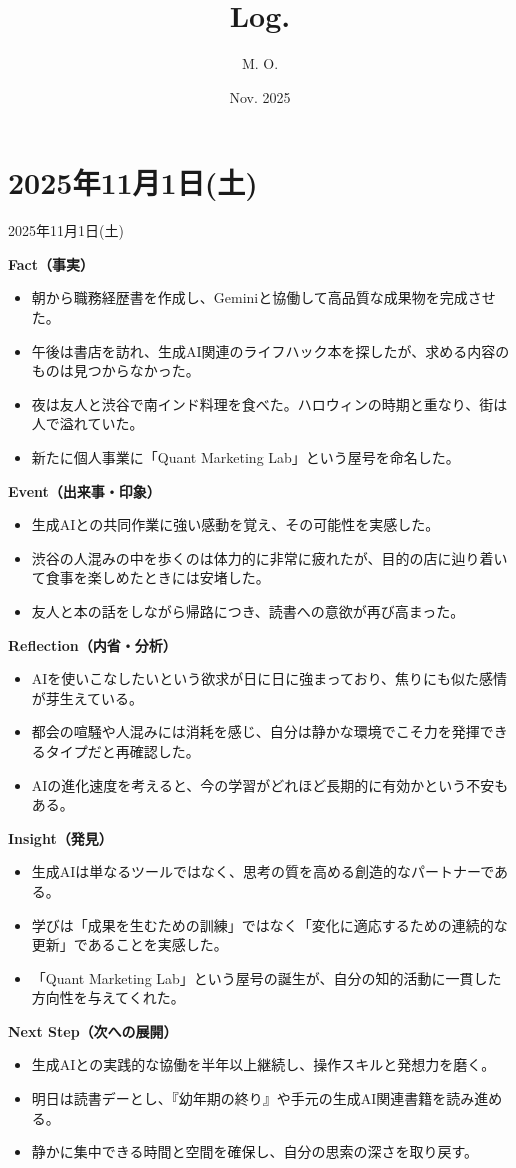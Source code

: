 \documentclass[dvipdfmx, autodetect-engine, aspectratio=169, 10.5pt]{beamer}
\title{
Log.
}
\author{
M. O.
}
\date{Nov. 2025}
\begin{document}
\maketitle

\section{2025年11月1日(土)} 
\begin{frame}{2025年11月1日(土)}  
	\tiny  

	\textbf{Fact（事実）}  
	\begin{itemize}
		\item 朝から職務経歴書を作成し、Geminiと協働して高品質な成果物を完成させた。  
		\item 午後は書店を訪れ、生成AI関連のライフハック本を探したが、求める内容のものは見つからなかった。  
		\item 夜は友人と渋谷で南インド料理を食べた。ハロウィンの時期と重なり、街は人で溢れていた。  
		\item 新たに個人事業に「Quant Marketing Lab」という屋号を命名した。  
	\end{itemize}

	\textbf{Event（出来事・印象）}  
	\begin{itemize}
		\item 生成AIとの共同作業に強い感動を覚え、その可能性を実感した。  
		\item 渋谷の人混みの中を歩くのは体力的に非常に疲れたが、目的の店に辿り着いて食事を楽しめたときには安堵した。  
		\item 友人と本の話をしながら帰路につき、読書への意欲が再び高まった。  
	\end{itemize}

	\textbf{Reflection（内省・分析）}  
	\begin{itemize}
		\item AIを使いこなしたいという欲求が日に日に強まっており、焦りにも似た感情が芽生えている。  
		\item 都会の喧騒や人混みには消耗を感じ、自分は静かな環境でこそ力を発揮できるタイプだと再確認した。  
		\item AIの進化速度を考えると、今の学習がどれほど長期的に有効かという不安もある。  
	\end{itemize}

	\textbf{Insight（発見）}  
	\begin{itemize}
		\item 生成AIは単なるツールではなく、思考の質を高める創造的なパートナーである。  
		\item 学びは「成果を生むための訓練」ではなく「変化に適応するための連続的な更新」であることを実感した。  
		\item 「Quant Marketing Lab」という屋号の誕生が、自分の知的活動に一貫した方向性を与えてくれた。  
	\end{itemize}

	\textbf{Next Step（次への展開）}  
	\begin{itemize}
		\item 生成AIとの実践的な協働を半年以上継続し、操作スキルと発想力を磨く。  
		\item 明日は読書デーとし、『幼年期の終り』や手元の生成AI関連書籍を読み進める。  
		\item 静かに集中できる時間と空間を確保し、自分の思索の深さを取り戻す。  
	\end{itemize}
\end{frame}
\end{document}
